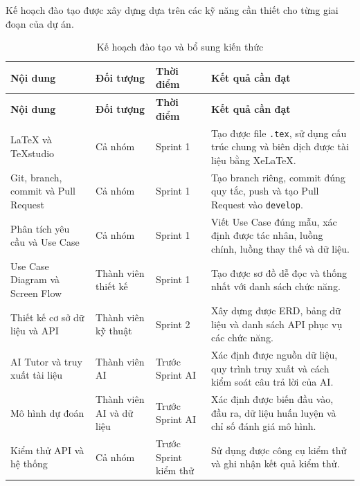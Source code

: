 Kế hoạch đào tạo được xây dựng dựa trên các kỹ năng cần thiết cho từng
giai đoạn của dự án.

\begin{longtable}{
		|p{3.6cm}
		|p{3.1cm}
		|p{2.5cm}
		|p{5.0cm}|
	}
	\caption{Kế hoạch đào tạo và bổ sung kiến thức}
	\label{tab:training-plan}\\
	\hline
	\textbf{Nội dung} &
	\textbf{Đối tượng} &
	\textbf{Thời điểm} &
	\textbf{Kết quả cần đạt} \\
	\hline
	\endfirsthead
	
	\hline
	\textbf{Nội dung} &
	\textbf{Đối tượng} &
	\textbf{Thời điểm} &
	\textbf{Kết quả cần đạt} \\
	\hline
	\endhead
	
	LaTeX và TeXstudio &
	Cả nhóm &
	Sprint 1 &
	Tạo được file \texttt{.tex}, sử dụng cấu trúc chung và biên dịch được
	tài liệu bằng XeLaTeX. \\
	\hline
	
	Git, branch, commit và Pull Request &
	Cả nhóm &
	Sprint 1 &
	Tạo branch riêng, commit đúng quy tắc, push và tạo Pull Request vào
	\texttt{develop}. \\
	\hline
	
	Phân tích yêu cầu và Use Case &
	Cả nhóm &
	Sprint 1 &
	Viết Use Case đúng mẫu, xác định được tác nhân, luồng chính, luồng thay
	thế và dữ liệu. \\
	\hline
	
	Use Case Diagram và Screen Flow &
	Thành viên thiết kế &
	Sprint 1 &
	Tạo được sơ đồ dễ đọc và thống nhất với danh sách chức năng. \\
	\hline
	
	Thiết kế cơ sở dữ liệu và API &
	Thành viên kỹ thuật &
	Sprint 2 &
	Xây dựng được ERD, bảng dữ liệu và danh sách API phục vụ các chức năng. \\
	\hline
	
	AI Tutor và truy xuất tài liệu &
	Thành viên AI &
	Trước Sprint AI &
	Xác định được nguồn dữ liệu, quy trình truy xuất và cách kiểm soát câu
	trả lời của AI. \\
	\hline
	
	Mô hình dự đoán &
	Thành viên AI và dữ liệu &
	Trước Sprint AI &
	Xác định được biến đầu vào, đầu ra, dữ liệu huấn luyện và chỉ số đánh
	giá mô hình. \\
	\hline
	
	Kiểm thử API và hệ thống &
	Cả nhóm &
	Trước Sprint kiểm thử &
	Sử dụng được công cụ kiểm thử và ghi nhận kết quả kiểm thử. \\
	\hline
	
\end{longtable}

